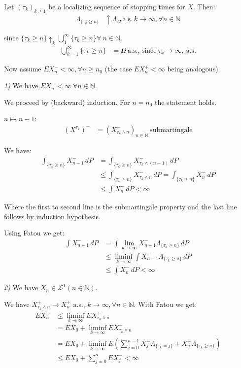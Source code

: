 \documentclass[12pt]{article}
\begin{document}
Let $(\tau_k)_{k \geq 1}$ be a localizing sequence of stopping times for $X$. Then: 
\begin{align*}
\Lambda_{\{\tau_k \geq n\}} &\uparrow \Lambda_{\Omega} \ \text{a.s.} \ k \to \infty, \forall n \in \mathbb{N}
\end{align*}

since $\{\tau_k \geq n\} \uparrow_k \bigcup_{1}^{\infty} \{\tau_k \geq n\} \forall \ n \in \mathbb{N}$.
\begin{align*}
\bigcup_{k=1}^{\infty} \{ \tau_k \geq n \} &= \Omega \ \text{a.s., since} \ \tau_k \to \infty, \ \text{a.s.}
\end{align*}

Now assume $E X_n^{-} < \infty, \forall n \geq n_0$ (the case $E X_n^{+} < \infty$ being analogous).

\emph{1)} We have $E X_n^{-} < \infty \ \forall n \in \mathbb{N}$.

We proceed by (backward) induction. For $n = n_0$ the statement holds.

$n \mapsto n-1$:
\begin{align*}
(X^{\tau_k})^{-} &= (X_{\tau_k \wedge n}^{-})_{n \in \mathbb{N}} \ \text{submartingale}
\end{align*}

We have:
\begin{align*}
\int_{ \{\tau_k \geq n\} } X_{n-1}^{-} \,dP &= \int_{\{\tau_k \geq n\}} X_{\tau_k \wedge (n-1)}^{-} \,dP \\
&\leq \int_{\{\tau_k \geq n\}} X_{\tau_k \wedge n}^{-} \,dP = \int_{\{\tau_k \geq n\}} X_n^{-}\,dP \\
&\leq \int X_n^{-} \,dP < \infty 
\end{align*}

Where the first to second line is the submartingale property and the last line follows by induction hypothesis.

Using Fatou we get:
\begin{align*}
\int X_{n-1}^{-} \,dP &= \int \lim_{k \to \infty} X_{n-1}^{-} \Lambda_{\{ \tau_k \geq n\} } \,dP \\
&\leq \liminf_{k \to \infty} \int X_{n-1}^{-} \Lambda_{\{\tau_k \geq n \} } \,dP \\
&\leq \int X_n^{-} \,dP < \infty
\end{align*}

\emph{2)} We have $X_n \in \mathscr{L}^1 (n \in \mathbb{N})$.

We have $X_{\tau_k \wedge n}^{+} \to X_n^{+}$ a.s., $k \to \infty, \forall n \in \mathbb{N}$. With Fatou we get:
\begin{align*}
E X_n^{+} &\leq \liminf_{k \to \infty} E X_{\tau_k \wedge n}^{+} \\
&= E X_0 + \liminf_{k \to \infty} E X_{\tau_k \wedge n}^{-} \\
&= E X_0 + \liminf_{k \to \infty} E \left(\sum_{j=0}^{n-1} X_j^{-} \Lambda_{ \{\tau_k = j\}} + X_n^{-} \Lambda_{\{\tau_k \geq n\}}\right) \\
&\leq E X_0 + \sum_{j=0}^n E X_j^{-} < \infty 
\end{align*}
\end{document}
